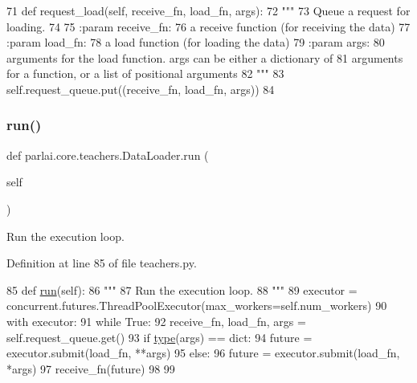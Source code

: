 \begin{DoxyCode}
71     \textcolor{keyword}{def }request\_load(self, receive\_fn, load\_fn, args):
72         \textcolor{stringliteral}{"""}
73 \textcolor{stringliteral}{        Queue a request for loading.}
74 \textcolor{stringliteral}{}
75 \textcolor{stringliteral}{        :param receive\_fn:}
76 \textcolor{stringliteral}{            a receive function (for receiving the data)}
77 \textcolor{stringliteral}{        :param load\_fn:}
78 \textcolor{stringliteral}{            a load function (for loading the data)}
79 \textcolor{stringliteral}{        :param args:}
80 \textcolor{stringliteral}{            arguments for the load function. args can be either a dictionary of}
81 \textcolor{stringliteral}{            arguments for a function, or a list of positional arguments}
82 \textcolor{stringliteral}{        """}
83         self.request\_queue.put((receive\_fn, load\_fn, args))
84 
\end{DoxyCode}
\mbox{\label{classparlai_1_1core_1_1teachers_1_1DataLoader_a2663781dd1e8cc85535e3cb075fbb8b7}} 
\subsubsection{\texorpdfstring{run()}{run()}}
{\footnotesize\ttfamily def parlai.\+core.\+teachers.\+Data\+Loader.\+run (\begin{DoxyParamCaption}\item[{}]{self }\end{DoxyParamCaption})}

\begin{DoxyVerb}Run the execution loop.
\end{DoxyVerb}
 

Definition at line 85 of file teachers.\+py.


\begin{DoxyCode}
85     \textcolor{keyword}{def }\hyperlink{namespaceparlai_1_1agents_1_1tfidf__retriever_1_1build__tfidf_a0d8cca9dbdf0fa23d25e81ec2a96b347}{run}(self):
86         \textcolor{stringliteral}{"""}
87 \textcolor{stringliteral}{        Run the execution loop.}
88 \textcolor{stringliteral}{        """}
89         executor = concurrent.futures.ThreadPoolExecutor(max\_workers=self.num\_workers)
90         with executor:
91             \textcolor{keywordflow}{while} \textcolor{keyword}{True}:
92                 receive\_fn, load\_fn, args = self.request\_queue.get()
93                 \textcolor{keywordflow}{if} \hyperlink{namespaceparlai_1_1agents_1_1tfidf__retriever_1_1build__tfidf_ad5dfae268e23f506da084a9efb72f619}{type}(args) == dict:
94                     future = executor.submit(load\_fn, **args)
95                 \textcolor{keywordflow}{else}:
96                     future = executor.submit(load\_fn, *args)
97                 receive\_fn(future)
98 
99 
\end{DoxyCode}


